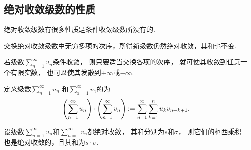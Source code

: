 \subsection{绝对收敛级数的性质}
绝对收敛级数有很多性质是条件收敛级数所没有的.

\begin{property}[绝对收敛级数的可交换性]\label{theorem:无穷级数.绝对收敛级数的可交换性}
交换绝对收敛级数中无穷多项的次序，所得新级数仍然绝对收敛，其和也不变.
\end{property}

\begin{theorem}[条件收敛级数的黎曼定理]
若级数\(\sum_{n=1}^\infty u_n\)条件收敛，
则只要适当交换各项的次序，
就可使其收敛到任意一个有限实数，
也可以使其发散到\(+\infty\)或\(-\infty\).
\end{theorem}

\begin{definition}\label{definition:无穷级数.绝对收敛级数的柯西乘积}
定义级数\(\sum_{n=1}^\infty u_n\)
和\(\sum_{n=1}^\infty v_n\)的为\[
	\left( \sum_{n=1}^\infty u_n \right)
	\cdot
	\left( \sum_{n=1}^\infty v_n \right)
	:=
	\sum_{n=1}^\infty \sum_{k=1}^n u_k v_{n-k+1}.
\]
\end{definition}

\begin{theorem}\label{theorem:无穷级数.绝对收敛级数的柯西乘积必收敛}
设级数\(\sum_{n=1}^\infty u_n\)和\(\sum_{n=1}^\infty v_n\)都绝对收敛，
其和分别为\(s\)和\(\sigma\)，
则它们的柯西乘积也是绝对收敛的，且其和为\(s \cdot \sigma\).
\end{theorem}

